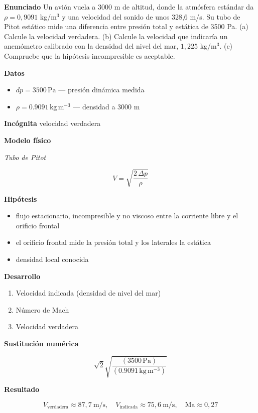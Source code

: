 \documentclass[10pt,openany]{book}
\begin{document}
\begin{tcolorbox}[title={Problema resuelto}, studiumworked, breakable]

\noindent\textbf{Enunciado}
Un avión vuela a 3000 m de altitud, donde la atmósfera estándar da \(\rho = 0{,}9091\) kg/m\(^3\) y una velocidad del sonido de unos 328,6 m/s. Su tubo de Pitot estático mide una diferencia entre presión total y estática de 3500 Pa. (a) Calcule la velocidad verdadera. (b) Calcule la velocidad que indicaría un anemómetro calibrado con la densidad del nivel del mar, \(1{,}225\) kg/m\(^3\). (c) Compruebe que la hipótesis incompresible es aceptable.

\noindent\textbf{Datos}
\begin{itemize}
\item $dp = 3500\,\mathrm{Pa}$ — presión dinámica medida
\item $\rho = 0.9091\,\mathrm{kg}\,\mathrm{m}^{-3}$ — densidad a 3000 m
\end{itemize}

\noindent\textbf{Incógnita}
velocidad verdadera

\noindent\textbf{Modelo físico}

\noindent\textit{Tubo de Pitot}

\[
V = \sqrt{\frac{2\,\Delta p}{\rho}}
\]

\noindent\textbf{Hipótesis}
\begin{itemize}
\item flujo estacionario, incompresible y no viscoso entre la corriente libre y el orificio frontal
\item el orificio frontal mide la presión total y los laterales la estática
\item densidad local conocida
\end{itemize}

\noindent\textbf{Desarrollo}
\begin{enumerate}
\item
Velocidad indicada (densidad de nivel del mar)
\item
Número de Mach
\item
Velocidad verdadera
\end{enumerate}

\noindent\textbf{Sustitución numérica}

\[
\sqrt{2} \sqrt{\frac{\left(3500\,\mathrm{Pa}\right)}{\left(0.9091\,\mathrm{kg}\,\mathrm{m}^{-3}\right)}}
\]

\noindent\textbf{Resultado}

\[
V_{\mathrm{verdadera}} \approx 87{,}7\ \mathrm{m/s},\quad V_{\mathrm{indicada}} \approx 75{,}6\ \mathrm{m/s},\quad \mathrm{Ma} \approx 0{,}27
\]


\end{tcolorbox}
\end{document}
